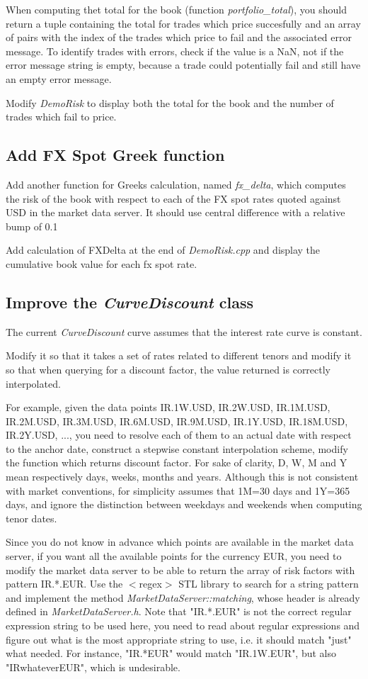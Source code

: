 \documentclass[10pt]{article}
\begin{document}
When computing thet total for the book (function \textit{portfolio\_total}), you should return a tuple containing the total for trades which price succesfully and an array of pairs with the index of the trades which price to fail and the associated error message. To identify trades with errors, check if the value is a NaN, not if the error message string is empty, because a trade could potentially fail and still have an empty error message.

Modify \textit{DemoRisk} to display both the total for the book and the number of trades which fail to price.

\subsection{Add FX Spot Greek function}
\label{sec:fxdelta}
Add another function for Greeks calculation, named \textit{fx\_delta}, which computes the risk of the book with respect to each of the FX spot rates quoted against USD in the market data server. It should use central difference with a relative bump of 0.1%

Add calculation of FXDelta at the end of \textit{DemoRisk.cpp} and display the cumulative book value for each fx spot rate.

\subsection{Improve the \textit{CurveDiscount} class}
The current \textit{CurveDiscount} curve assumes that the interest rate curve is constant.

Modify it so that it takes a set of rates related to different tenors and modify it so that when querying for a discount factor, the value returned is correctly interpolated.

For example, given the data points {IR.1W.USD, IR.2W.USD, IR.1M.USD, IR.2M.USD, IR.3M.USD, IR.6M.USD, IR.9M.USD, IR.1Y.USD, IR.18M.USD, IR.2Y.USD, ...}, you need to resolve each of them to an actual date with respect to the anchor date, construct a stepwise constant interpolation scheme, modify the function which returns discount factor. For sake of clarity, D, W, M and Y mean respectively days, weeks, months and years. Although this is not consistent with market conventions, for simplicity assumes that 1M=30 days and 1Y=365 days, and ignore the distinction between weekdays and weekends when computing tenor dates.

Since you do not know in advance which points are available in the market data server, if you want all the available points for the currency EUR, you need to modify the market data server to be able to return the array of risk factors with pattern IR.*.EUR. Use the $<$regex$>$ STL library to search for a string pattern and implement the method \textit{MarketDataServer::matching}, whose header is already defined in \textit{MarketDataServer.h}. Note that "IR.*.EUR" is not the correct regular expression string to be used here, you need to read about regular expressions and figure out what is the most appropriate string to use, i.e. it should match "just" what needed. For instance, "IR.*EUR" would match "IR.1W.EUR", but also "IRwhateverEUR", which is undesirable.
\end{document}
